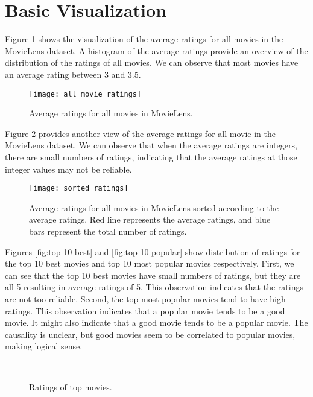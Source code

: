 \section{Basic Visualization}

Figure \ref{fig:all-movie} shows the visualization of the average ratings for all movies in the MovieLens dataset. A histogram of the average ratings provide an overview of the distribution of the ratings of all movies. We can observe that most movies have an average rating between 3 and 3.5. 

\begin{figure}[H]
	\centering
	\texttt{[image: all\_movie\_ratings]}
	\caption{Average ratings for all movies in MovieLens.} \label{fig:all-movie}
\end{figure}


Figure \ref{fig:all-movie-sorted} provides another view of the average ratings for all movie in the MovieLens dataset. We can observe that when the average ratings are integers, there are small numbers of ratings, indicating that the average ratings at those integer values may not be reliable.

\begin{figure}[H]
	\centering
	\texttt{[image: sorted\_ratings]}
	\caption{Average ratings for all movies in MovieLens sorted according to the average ratings. Red line represents the average ratings, and blue bars represent the total number of ratings.} \label{fig:all-movie-sorted} 
\end{figure}

Figures \ref{fig:top-10-best} and \ref{fig:top-10-popular} show distribution of ratings for the top 10 best movies and top 10 most popular movies respectively. First, we can see that the top 10 best movies have small numbers of ratings, but they are all 5 resulting in average ratings of 5. This observation indicates that the ratings are not too reliable. Second, the top most popular movies tend to have high ratings. This observation indicates that a popular movie tends to be a good movie. It might also indicate that a good movie tends to be a popular movie. The causality is unclear, but good movies seem to be correlated to popular movies, making logical sense. 

\begin{figure}[H]
	\centering
	\\
	\caption{Ratings of top movies.} 
\end{figure}

